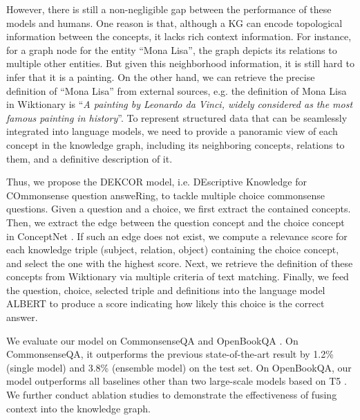 \documentclass[11pt,a4paper]{article}
\begin{document}
However, there is still a non-negligible gap between the performance of these models and humans. One reason is that, although a KG can encode topological information between the concepts, it lacks rich context information. For instance, for a graph node for the entity ``Mona Lisa'', the graph depicts its relations to multiple other entities. But given this neighborhood information, it is still hard to infer that it is a painting. On the other hand, we can retrieve the precise definition of ``Mona Lisa'' from external sources, e.g. the definition of Mona Lisa in Wiktionary is ``\textit{A painting by Leonardo da Vinci, widely considered as the most famous painting in history}''. To represent structured data that can be seamlessly integrated into language models, we need to provide a panoramic view of each concept in the knowledge graph, including its neighboring concepts, relations to them, and a definitive description of it.

Thus, we propose the DEKCOR model, i.e. DEscriptive Knowledge for COmmonsense question answeRing, to tackle multiple choice commonsense questions. Given a question and a choice, we first extract the contained concepts. Then, we extract the edge between the question concept and the choice concept in ConceptNet \citep{conceptnet}. If such an edge does not exist, we compute a relevance score for each knowledge triple (subject, relation, object) containing the choice concept, and select the one with the highest score. Next, we retrieve the definition of these concepts from Wiktionary via multiple criteria of text matching. Finally, we feed the question, choice, selected triple and definitions into the language model ALBERT \citep{ALBERT} to produce a score indicating how likely this choice is the correct answer.

We evaluate our model on CommonsenseQA \citep{csqa} and OpenBookQA \citep{mihaylov2018can}. On CommonsenseQA, it outperforms the previous state-of-the-art result by 1.2\% (single model) and 3.8\% (ensemble model) on the test set. On OpenBookQA, our model outperforms all baselines other than two large-scale models based on T5 \citep{t5}. We further conduct ablation studies to demonstrate the effectiveness of fusing context into the knowledge graph.
\end{document}
